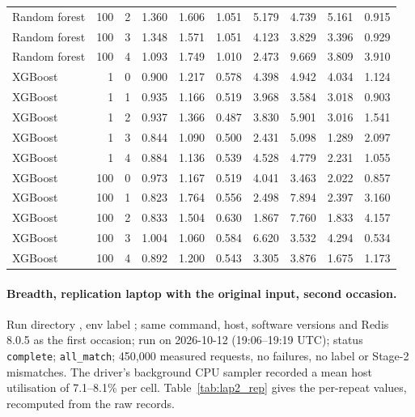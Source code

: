 \documentclass[10pt,a4paper]{article}
\begin{document}
\begin{longtable}{lrrrrrrrrr}
Random forest & 100 & 2 & 1.360 & 1.606 & 1.051 & 5.179 & 4.739 & 5.161 & 0.915 \\
Random forest & 100 & 3 & 1.348 & 1.571 & 1.051 & 4.123 & 3.829 & 3.396 & 0.929 \\
Random forest & 100 & 4 & 1.093 & 1.749 & 1.010 & 2.473 & 9.669 & 3.809 & 3.910 \\
XGBoost & 1 & 0 & 0.900 & 1.217 & 0.578 & 4.398 & 4.942 & 4.034 & 1.124 \\
XGBoost & 1 & 1 & 0.935 & 1.166 & 0.519 & 3.968 & 3.584 & 3.018 & 0.903 \\
XGBoost & 1 & 2 & 0.937 & 1.366 & 0.487 & 3.830 & 5.901 & 3.016 & 1.541 \\
XGBoost & 1 & 3 & 0.844 & 1.090 & 0.500 & 2.431 & 5.098 & 1.289 & 2.097 \\
XGBoost & 1 & 4 & 0.884 & 1.136 & 0.539 & 4.528 & 4.779 & 2.231 & 1.055 \\
XGBoost & 100 & 0 & 0.973 & 1.167 & 0.519 & 4.041 & 3.463 & 2.022 & 0.857 \\
XGBoost & 100 & 1 & 0.823 & 1.764 & 0.556 & 2.498 & 7.894 & 2.397 & 3.160 \\
XGBoost & 100 & 2 & 0.833 & 1.504 & 0.630 & 1.867 & 7.760 & 1.833 & 4.157 \\
XGBoost & 100 & 3 & 1.004 & 1.060 & 0.584 & 6.620 & 3.532 & 4.294 & 0.534 \\
XGBoost & 100 & 4 & 0.892 & 1.200 & 0.543 & 3.305 & 3.876 & 1.675 & 1.173 \\
\bottomrule
\end{longtable}

\paragraph{Breadth, replication laptop with the original input, second occasion.} Run directory , env label ; same command, host, software versions and Redis 8.0.5 as the first occasion; run on 2026-10-12 (19:06--19:19 UTC); status \texttt{complete}; \texttt{all\_match}; 450,000 measured requests, no failures, no label or Stage-2 mismatches. The driver's background CPU sampler recorded a mean host utilisation of 7.1--8.1\% per cell. Table~\ref{tab:lap2_rep} gives the per-repeat values, recomputed from the raw records.
\end{document}
